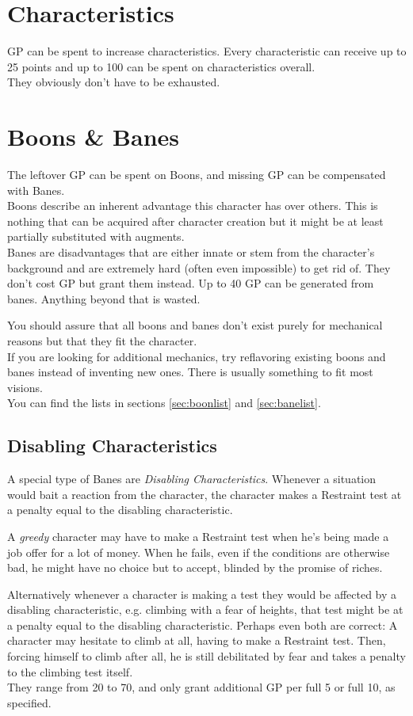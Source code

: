 \documentclass[12pt,a4paper,openany,dvipsnames]{book}
\begin{document}
	\section{Characteristics}
	GP can be spent to increase characteristics. Every characteristic can receive up to 25 points and up to 100 can be spent on characteristics overall.\\
	They obviously don’t have to be exhausted.
	\section{Boons \& Banes}
	The leftover GP can be spent on Boons, and missing GP can be compensated with Banes.\\
	Boons describe an inherent advantage this character has over others. This is nothing that can be acquired after character creation but it might be at least partially substituted with augments.\\
	Banes are disadvantages that are either innate or stem from the character’s background and are extremely hard (often even impossible) to get rid of.
	They don’t cost GP but grant them instead.
	Up to 40 GP can be generated from banes.
	Anything beyond that is wasted.
	\par
	You should assure that all boons and banes don’t exist purely for mechanical reasons but that they fit the character.\\
	If you are looking for additional mechanics, try reflavoring existing boons and banes instead of inventing new ones. There is usually something to fit most visions.\\
	You can find the lists in sections \ref{sec:boonlist} and \ref{sec:banelist}.

	\subsection{Disabling Characteristics}
	A special type of Banes are \emph{Disabling Characteristics}.
	Whenever a situation would bait a reaction from the character,
		the character makes a Restraint test at a penalty equal to the disabling characteristic.
		\begin{exampleblock}
			A \emph{greedy} character may have to make a Restraint test
				when he's being made a job offer for a lot of money.
			When he fails, even if the conditions are otherwise bad,
				he might have no choice but to accept,
				blinded by the promise of riches.
		\end{exampleblock}
	Alternatively whenever a character is making a test they would be affected by a disabling characteristic,
	e.g. climbing with a fear of heights, that test might be at a penalty equal to the disabling characteristic.
	Perhaps even both are correct:
	A character may hesitate to climb at all, having to make a Restraint test.
	Then, forcing himself to climb after all,
		he is still debilitated by fear and takes a penalty to the climbing test itself.
	\\%
	They range from 20 to 70, and only grant additional GP per full 5 or full 10, as specified.
\end{document}
